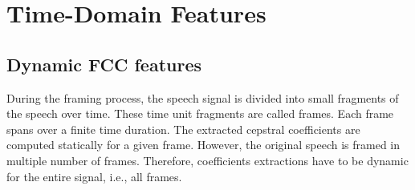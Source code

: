 
\section{Time-Domain Features}
\subsection{Dynamic FCC features}
During the framing process, the speech signal 
is divided into small fragments of the speech over time. 
These time unit fragments are called frames.
Each frame spans over a finite time duration.
The extracted cepstral coefficients are computed statically
for a given frame. However, the original speech
is framed in multiple number of frames. 
Therefore, coefficients extractions
have to be dynamic for the entire signal, i.e., all frames.

